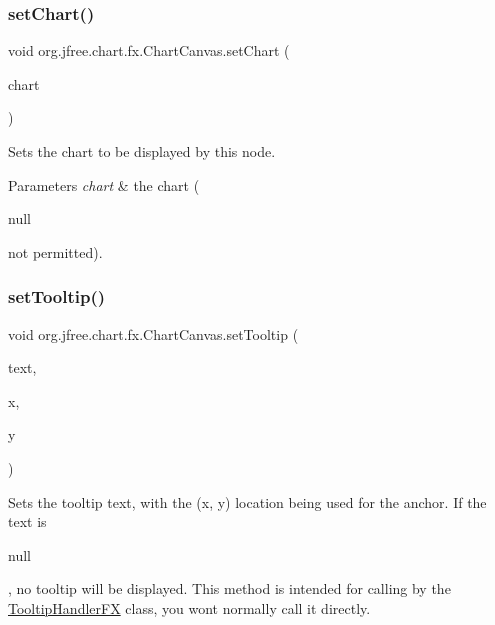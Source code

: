 \subsubsection{\texorpdfstring{set\+Chart()}{setChart()}}
{\footnotesize\ttfamily void org.\+jfree.\+chart.\+fx.\+Chart\+Canvas.\+set\+Chart (\begin{DoxyParamCaption}\item[{\mbox{\hyperlink{classorg_1_1jfree_1_1chart_1_1_j_free_chart}{J\+Free\+Chart}}}]{chart }\end{DoxyParamCaption})}

Sets the chart to be displayed by this node.


\begin{DoxyParams}{Parameters}
{\em chart} & the chart (
\begin{DoxyCode}
null 
\end{DoxyCode}
 not permitted). \\
\hline
\end{DoxyParams}
\mbox{\label{classorg_1_1jfree_1_1chart_1_1fx_1_1_chart_canvas_a5c0315e931ce6d21aa380b890c95c438}} 
\subsubsection{\texorpdfstring{set\+Tooltip()}{setTooltip()}}
{\footnotesize\ttfamily void org.\+jfree.\+chart.\+fx.\+Chart\+Canvas.\+set\+Tooltip (\begin{DoxyParamCaption}\item[{String}]{text,  }\item[{double}]{x,  }\item[{double}]{y }\end{DoxyParamCaption})}

Sets the tooltip text, with the (x, y) location being used for the anchor. If the text is
\begin{DoxyCode}
null 
\end{DoxyCode}
 , no tooltip will be displayed. This method is intended for calling by the \mbox{\hyperlink{}{Tooltip\+Handler\+FX}} class, you won\textquotesingle{}t normally call it directly.


